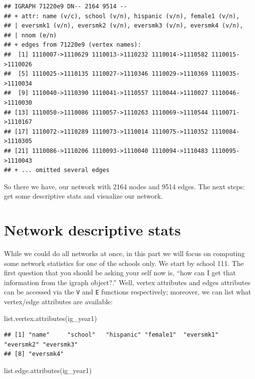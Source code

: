 \documentclass[
]{book}
\newenvironment{Shaded}{\begin{snugshade}}{\end{snugshade}}
\newcommand{\FunctionTok}[1]{\textcolor[rgb]{0.00,0.00,0.00}{#1}}
\newcommand{\NormalTok}[1]{#1}
\begin{document}
\begin{verbatim}
## IGRAPH 71220e9 DN-- 2164 9514 -- 
## + attr: name (v/c), school (v/n), hispanic (v/n), female1 (v/n),
## | eversmk1 (v/n), eversmk2 (v/n), eversmk3 (v/n), eversmk4 (v/n),
## | nnom (e/n)
## + edges from 71220e9 (vertex names):
##  [1] 1110007->1110629 1110013->1110232 1110014->1110582 1110015->1110026
##  [5] 1110025->1110135 1110027->1110346 1110029->1110369 1110035->1110034
##  [9] 1110040->1110390 1110041->1110557 1110044->1110027 1110046->1110030
## [13] 1110050->1110086 1110057->1110263 1110069->1110544 1110071->1110167
## [17] 1110072->1110289 1110073->1110014 1110075->1110352 1110084->1110305
## [21] 1110086->1110206 1110093->1110040 1110094->1110483 1110095->1110043
## + ... omitted several edges
\end{verbatim}

So there we have, our network with 2164 nodes and 9514 edges. The next steps: get some descriptive stats and visualize our network.

\hypertarget{network-descriptive-stats}{%
\section{Network descriptive stats}\label{network-descriptive-stats}}

While we could do all networks at once, in this part we will focus on computing some network statistics for one of the schools only. We start by school 111. The first question that you should be asking your self now is, ``how can I get that information from the igraph object?.'' Well, vertex attributes and edges attributes can be accessed via the \texttt{V} and \texttt{E} functions respectively; moreover, we can list what vertex/edge attributes are available:

\begin{Shaded}
\begin{Highlighting}[]
\FunctionTok{list.vertex.attributes}\NormalTok{(ig\_year1)}
\end{Highlighting}
\end{Shaded}

\begin{verbatim}
## [1] "name"     "school"   "hispanic" "female1"  "eversmk1" "eversmk2" "eversmk3"
## [8] "eversmk4"
\end{verbatim}

\begin{Shaded}
\begin{Highlighting}[]
\FunctionTok{list.edge.attributes}\NormalTok{(ig\_year1) }
\end{Highlighting}
\end{Shaded}
\end{document}
